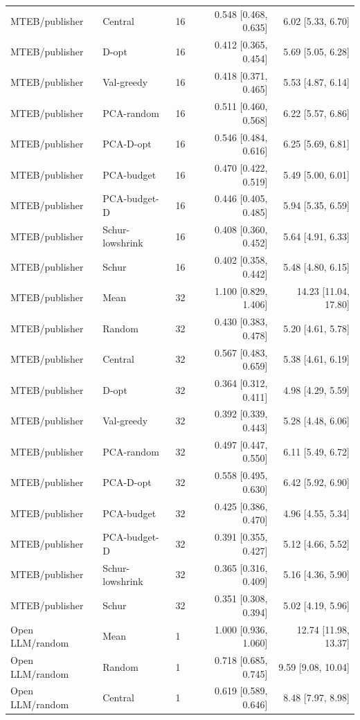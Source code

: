 \begin{longtable}{lllrr}
MTEB/publisher & Central & 16 & 0.548 [0.468, 0.635] & 6.02 [5.33, 6.70]\\
MTEB/publisher & D-opt & 16 & 0.412 [0.365, 0.454] & 5.69 [5.05, 6.28]\\
MTEB/publisher & Val-greedy & 16 & 0.418 [0.371, 0.465] & 5.53 [4.87, 6.14]\\
MTEB/publisher & PCA-random & 16 & 0.511 [0.460, 0.568] & 6.22 [5.57, 6.86]\\
MTEB/publisher & PCA-D-opt & 16 & 0.546 [0.484, 0.616] & 6.25 [5.69, 6.81]\\
MTEB/publisher & PCA-budget & 16 & 0.470 [0.422, 0.519] & 5.49 [5.00, 6.01]\\
MTEB/publisher & PCA-budget-D & 16 & 0.446 [0.405, 0.485] & 5.94 [5.35, 6.59]\\
MTEB/publisher & Schur-lowshrink & 16 & 0.408 [0.360, 0.452] & 5.64 [4.91, 6.33]\\
MTEB/publisher & Schur & 16 & 0.402 [0.358, 0.442] & 5.48 [4.80, 6.15]\\
MTEB/publisher & Mean & 32 & 1.100 [0.829, 1.406] & 14.23 [11.04, 17.80]\\
MTEB/publisher & Random & 32 & 0.430 [0.383, 0.478] & 5.20 [4.61, 5.78]\\
MTEB/publisher & Central & 32 & 0.567 [0.483, 0.659] & 5.38 [4.61, 6.19]\\
MTEB/publisher & D-opt & 32 & 0.364 [0.312, 0.411] & 4.98 [4.29, 5.59]\\
MTEB/publisher & Val-greedy & 32 & 0.392 [0.339, 0.443] & 5.28 [4.48, 6.06]\\
MTEB/publisher & PCA-random & 32 & 0.497 [0.447, 0.550] & 6.11 [5.49, 6.72]\\
MTEB/publisher & PCA-D-opt & 32 & 0.558 [0.495, 0.630] & 6.42 [5.92, 6.90]\\
MTEB/publisher & PCA-budget & 32 & 0.425 [0.386, 0.470] & 4.96 [4.55, 5.34]\\
MTEB/publisher & PCA-budget-D & 32 & 0.391 [0.355, 0.427] & 5.12 [4.66, 5.52]\\
MTEB/publisher & Schur-lowshrink & 32 & 0.365 [0.316, 0.409] & 5.16 [4.36, 5.90]\\
MTEB/publisher & Schur & 32 & 0.351 [0.308, 0.394] & 5.02 [4.19, 5.96]\\
Open LLM/random & Mean & 1 & 1.000 [0.936, 1.060] & 12.74 [11.98, 13.37]\\
Open LLM/random & Random & 1 & 0.718 [0.685, 0.745] & 9.59 [9.08, 10.04]\\
Open LLM/random & Central & 1 & 0.619 [0.589, 0.646] & 8.48 [7.97, 8.98]\\

\end{longtable}

